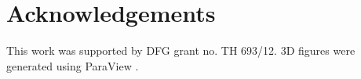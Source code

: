 
%
\section*{Acknowledgements} %
\label{sec:acknowledgements}
This work was supported by DFG grant no. TH 693/12. 3D figures were generated
using ParaView \cite{Ahrens2005}.
